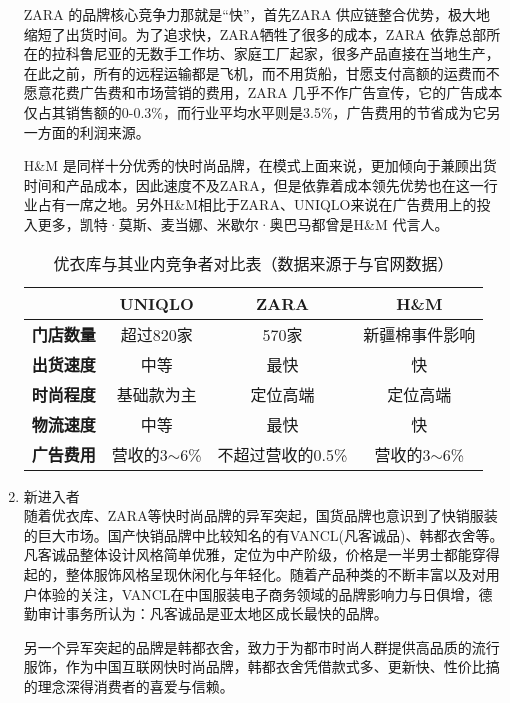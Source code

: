 \documentclass{xjtureport}
\begin{document}
\begin{enumerate}
        ZARA 的品牌核心竞争力那就是“快”，首先ZARA 供应链整合优势，极大地缩短了出货时间。为了追求快，ZARA牺牲了很多的成本，ZARA 依靠总部所在的拉科鲁尼亚的无数手工作坊、家庭工厂起家，很多产品直接在当地生产，在此之前，所有的远程运输都是飞机，而不用货船，甘愿支付高额的运费而不愿意花费广告费和市场营销的费用，ZARA 几乎不作广告宣传，它的广告成本仅占其销售额的0-0.3\%，而行业平均水平则是3.5\%，广告费用的节省成为它另一方面的利润来源。\cite{ref9}

        H\&M 是同样十分优秀的快时尚品牌，在模式上面来说，更加倾向于兼顾出货时间和产品成本，因此速度不及ZARA，但是依靠着成本领先优势也在这一行业占有一席之地。另外H\&M相比于ZARA、UNIQLO来说在广告费用上的投入更多，凯特·莫斯、麦当娜、米歇尔·奥巴马都曾是H\&M 代言人。\cite{ref9}
\begin{table}[H]
    \renewcommand\arraystretch{1.5}
    \centering
    \caption{优衣库与其业内竞争者对比表（数据来源于\cite{ref10}与官网数据）}
    \begin{tabular}{@{}cccc@{}}
    \toprule
                & \textbf{UNIQLO} & \textbf{ZARA} & \textbf{H\&M} \\ \midrule
    \textbf{门店数量} & 超过820家          & 570家          & 新疆棉事件影响       \\
    \textbf{出货速度} & 中等              & 最快            & 快             \\
    \textbf{时尚程度} & 基础款为主           & 定位高端          & 定位高端          \\
    \textbf{物流速度} & 中等              & 最快            & 快             \\
    \textbf{广告费用} & 营收的3$\sim$6\%   & 不超过营收的0.5\%   & 营收的3$\sim$6\% \\ \bottomrule
    \end{tabular}
    \end{table}
    \item 新进入者\\
    随着优衣库、ZARA等快时尚品牌的异军突起，国货品牌也意识到了快销服装的巨大市场。国产快销品牌中比较知名的有VANCL(凡客诚品)、韩都衣舍等。凡客诚品整体设计风格简单优雅，定位为中产阶级，价格是一半男士都能穿得起的，整体服饰风格呈现休闲化与年轻化。随着产品种类的不断丰富以及对用户体验的关注，VANCL在中国服装电子商务领域的品牌影响力与日俱增，德勤审计事务所认为：凡客诚品是亚太地区成长最快的品牌。

    另一个异军突起的品牌是韩都衣舍，致力于为都市时尚人群提供高品质的流行服饰，作为中国互联网快时尚品牌，韩都衣舍凭借款式多、更新快、性价比搞的理念深得消费者的喜爱与信赖。


\end{enumerate}
\end{document}
